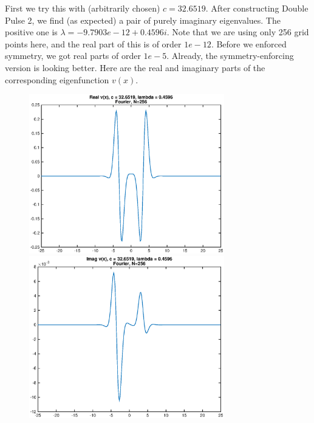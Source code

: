 \documentclass[12pt]{article}
\begin{document}
First we try this with (arbitrarily chosen) $c = 32.6519$. After constructing Double Pulse 2, we find (as expected) a pair of purely imaginary eigenvalues. The positive one is $\lambda = -9.7903e-12 + 0.4596i$. Note that we are using only 256 grid points here, and the real part of this is of order $1e-12$. Before we enforced symmetry, we got real parts of order $1e-5$. Already, the symmetry-enforcing version is looking better. Here are the real and imaginary parts of the corresponding eigenfunction $v(x)$.

\begin{figure}[H]
\includegraphics[width=8.5cm]{1eigenfnrealbefore.eps}
\includegraphics[width=8.5cm]{1eigenfnimagbefore.eps}
\end{figure}
\end{document}
